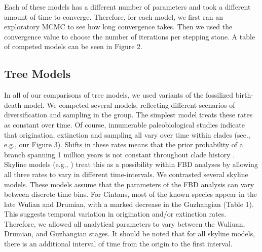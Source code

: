 \documentclass{article}
\begin{document}
Each of these models has a different number of parameters and took a different amount of time to converge. Therefore, for each model, we first ran an exploratory MCMC to see how long convergence takes. Then we used the convergence value to choose the number of iterations per stepping stone.
A table of competed models can be seen in Figure 2.

\subsection{Tree Models}

In all of our comparisons of tree models, we used variants of the fossilized birth-death model.
We competed several models, reflecting different scenarios of diversification and sampling in the group.
The simplest model treats these rates as constant over time.  
Of course, innumerable paleobiological studies indicate that origination, extinction and sampling all vary over time within clades (see., e.g., our Figure 3).  Shifts in these rates means that the prior probability of a branch spanning 1 million years is not constant throughout clade history \citep{Wagner2019}. %
Skyline models (e.g., \citep{Stadler2013b}) treat this as a possibility within FBD analyses by allowing all three rates to vary in different time-intervals. 
We contrasted several skyline models.%
These models assume that the parameters of the FBD analysis can vary between discrete time bins.
For Cintans, most of the known species appear in the late Wulian and Drumian, with a marked decrease in the Guzhangian (Table 1).  This suggests temporal variation in origination and/or extinction rates.
Therefore, we allowed all analytical parameters to vary between the Wuliuan, Drumian, and Guzhangian stages.
It should be noted that for all skyline models, there is an additional interval of time from the origin to the first interval.
\end{document}
